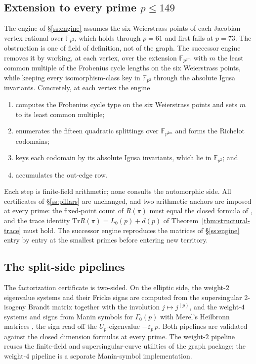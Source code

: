 \documentclass[11pt]{amsart}
\theoremstyle{plain}
\theoremstyle{definition}
\newcommand{\F}{\mathbb{F}}
\newcommand{\Tr}{\mathrm{Tr}}
\newcommand{\eps}{\varepsilon}
\begin{document}
	\subsection{Extension to every prime $p\le149$}
	\label{ss:extension}
	
	The engine of \S\ref{ss:engine} assumes the six Weierstrass points of each
	Jacobian vertex rational over $\F_{p^2}$, which holds through $p=61$ and
	first fails at $p=73$. The obstruction is one of field of definition, not
	of the graph. The successor engine removes it by working, at each vertex,
	over the extension $\F_{p^{2m}}$ with $m$ the least common multiple of the
	Frobenius cycle lengths on the six Weierstrass points, while keeping every
	isomorphism-class key in $\F_{p^2}$ through the absolute Igusa invariants.
	Concretely, at each vertex the engine
	\begin{enumerate}[label=\textup{(\roman*)},leftmargin=2.4em]
		\item computes the Frobenius cycle type on the six Weierstrass points and
		sets $m$ to its least common multiple;
		\item enumerates the fifteen quadratic splittings over $\F_{p^{2m}}$ and
		forms the Richelot codomains;
		\item keys each codomain by its absolute Igusa invariants, which lie in
		$\F_{p^2}$; and
		\item accumulates the out-edge row.
	\end{enumerate}
	Each step is finite-field arithmetic; none consults the automorphic side.
	All certificates of \S\ref{ss:pillars} are unchanged, and two arithmetic
	anchors are imposed at every prime: the fixed-point count of $R(\pi)$ must
	equal the closed formula of \cite[Thm.~2, Rem.~3]{IbukiyamaKatsura}, and
	the trace identity $\Tr R(\pi)=L_0(p)+d(p)$ of
	Theorem~\ref{thm:structural-trace} must hold. The successor engine
	reproduces the matrices of \S\ref{ss:engine} entry by entry at the
	smallest primes before entering new territory.
	
	\subsection{The split-side pipelines}
	\label{ss:split-pipelines}
	
	The factorization certificate is two-sided. On the elliptic side, the
	weight-$2$ eigenvalue systems and their Fricke signs are computed from the
	supersingular $2$-isogeny Brandt matrix together with the involution
	$j\mapsto j^{(p)}$, and the weight-$4$ systems and signs from Manin
	symbols \cite{Manin1972,Cremona1997} for $\Gamma_0(p)$ with Merel's
	Heilbronn matrices \cite{Merel1994}, the sign read off the $U_p$-eigenvalue
	$-\eps_p\,p$. Both pipelines are validated against the closed dimension
	formulas at every prime. The weight-$2$ pipeline reuses the finite-field
	and supersingular-curve utilities of the graph package; the weight-$4$
	pipeline is a separate Manin-symbol implementation.
	
\end{document}
